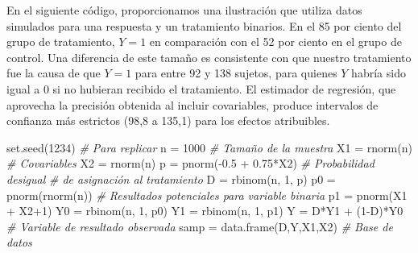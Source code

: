 \documentclass[
]{article}
\newenvironment{Shaded}{\begin{snugshade}}{\end{snugshade}}
\newcommand{\CommentTok}[1]{\textcolor[rgb]{0.56,0.35,0.01}{\textit{#1}}}
\newcommand{\DecValTok}[1]{\textcolor[rgb]{0.00,0.00,0.81}{#1}}
\newcommand{\FloatTok}[1]{\textcolor[rgb]{0.00,0.00,0.81}{#1}}
\newcommand{\FunctionTok}[1]{\textcolor[rgb]{0.00,0.00,0.00}{#1}}
\newcommand{\NormalTok}[1]{#1}
\newcommand{\OtherTok}[1]{\textcolor[rgb]{0.56,0.35,0.01}{#1}}
\newcommand{\SpecialCharTok}[1]{\textcolor[rgb]{0.00,0.00,0.00}{#1}}
\begin{document}
En el siguiente código, proporcionamos una ilustración que utiliza datos
simulados para una respuesta y un tratamiento binarios. En el 85 por
ciento del grupo de tratamiento, \(Y = 1\) en comparación con el 52 por
ciento en el grupo de control. Una diferencia de este tamaño es
consistente con que nuestro tratamiento fue la causa de que \(Y = 1\)
para entre 92 y 138 sujetos, para quienes \(Y\) habría sido igual a 0 si
no hubieran recibido el tratamiento. El estimador de regresión, que
aprovecha la precisión obtenida al incluir covariables, produce
intervalos de confianza más estrictos (98,8 a 135,1) para los efectos
atribuibles.

\begin{Shaded}
\begin{Highlighting}[]
\FunctionTok{set.seed}\NormalTok{(}\DecValTok{1234}\NormalTok{) }\CommentTok{\# Para replicar }
\NormalTok{n }\OtherTok{=} \DecValTok{1000} \CommentTok{\# Tamaño de la muestra}
\NormalTok{X1 }\OtherTok{=} \FunctionTok{rnorm}\NormalTok{(n) }\CommentTok{\# Covariables}
\NormalTok{X2 }\OtherTok{=} \FunctionTok{rnorm}\NormalTok{(n) }
\NormalTok{p }\OtherTok{=} \FunctionTok{pnorm}\NormalTok{(}\SpecialCharTok{{-}}\FloatTok{0.5} \SpecialCharTok{+} \FloatTok{0.75}\SpecialCharTok{*}\NormalTok{X2) }\CommentTok{\# Probabilidad desigual }
                           \CommentTok{\# de asignación al tratamiento }
\NormalTok{D }\OtherTok{=} \FunctionTok{rbinom}\NormalTok{(n, }\DecValTok{1}\NormalTok{, p) }
\NormalTok{p0 }\OtherTok{=} \FunctionTok{pnorm}\NormalTok{(}\FunctionTok{rnorm}\NormalTok{(n)) }\CommentTok{\# Resultados potenciales para variable binaria}
\NormalTok{p1 }\OtherTok{=} \FunctionTok{pnorm}\NormalTok{(X1 }\SpecialCharTok{+}\NormalTok{ X2}\SpecialCharTok{+}\DecValTok{1}\NormalTok{) }
\NormalTok{Y0 }\OtherTok{=} \FunctionTok{rbinom}\NormalTok{(n, }\DecValTok{1}\NormalTok{, p0) }
\NormalTok{Y1 }\OtherTok{=} \FunctionTok{rbinom}\NormalTok{(n, }\DecValTok{1}\NormalTok{, p1) }
\NormalTok{Y }\OtherTok{=}\NormalTok{ D}\SpecialCharTok{*}\NormalTok{Y1 }\SpecialCharTok{+}\NormalTok{ (}\DecValTok{1}\SpecialCharTok{{-}}\NormalTok{D)}\SpecialCharTok{*}\NormalTok{Y0 }\CommentTok{\#  Variable de resultado observada}
\NormalTok{samp }\OtherTok{=} \FunctionTok{data.frame}\NormalTok{(D,Y,X1,X2) }\CommentTok{\# Base de datos}


\end{Highlighting}
\end{Shaded}
\end{document}
